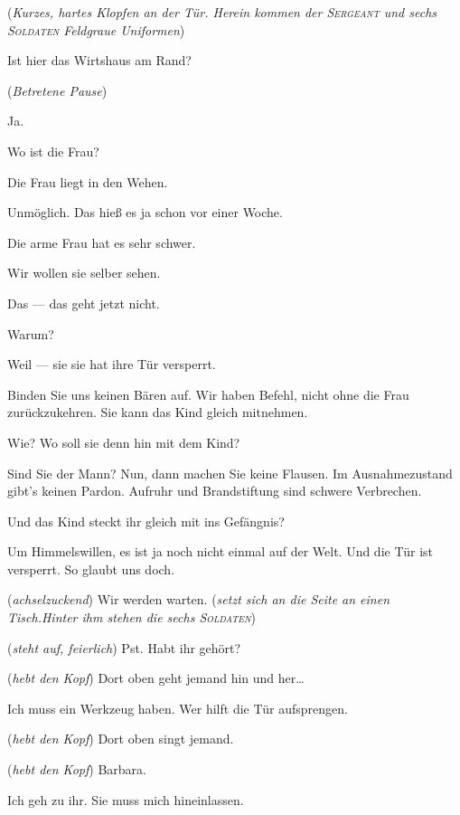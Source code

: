 \documentclass[
	final,
	a4paper,
	ngerman,
	mpinclude = true, %
	twoside = true,
	open = right,
	cleardoublepage = plain,
	DIV = 13,
	BCOR = 1cm,
	titlepage = firstiscover,
	]{scrbook}
\newcommand{\direction}[1]{(\textit{#1})}
\newcommand{\thecharacter}[1]{\textup{\textsc{#1}}\xspace}
\newcommand{\theJosef}{\thecharacter{Josef}}
\newcommand{\theJan}{\thecharacter{Jan}}
\newcommand{\theSergeant}{\thecharacter{Sergeant}}
\newcommand{\theSoldaten}{\thecharacter{Soldaten}}
\newcommand{\character}[1]{\item[#1]}
\newcommand{\Josef}{\character{\theJosef}}
\newcommand{\Jan}{\character{\theJan}}
\newcommand{\Heilsarmeeschwester}{\character{Schwester}}
\newcommand{\Sergeant}{\character{\theSergeant}}
\begin{document}
\begin{play}
\direction{Kurzes, hartes Klopfen an der Tür. Herein kommen der \theSergeant und sechs \theSoldaten Feldgraue Uniformen}

\Sergeant
Ist hier das Wirtshaus am Rand?

\direction{Betretene Pause}

\Heilsarmeeschwester
Ja.

\Sergeant
Wo ist die Frau?

\Heilsarmeeschwester
Die Frau liegt in den Wehen.

\Sergeant
Unmöglich. Das hieß es ja schon vor einer Woche.

\Heilsarmeeschwester
Die arme Frau hat es sehr schwer.

\Sergeant
Wir wollen sie selber sehen.

\Heilsarmeeschwester
Das --- das geht jetzt nicht.

\Sergeant
Warum?

\Heilsarmeeschwester
Weil --- sie sie hat ihre Tür versperrt.

\Sergeant
Binden Sie uns keinen Bären auf. Wir haben Befehl, nicht ohne die Frau zurückzukehren. Sie kann das Kind gleich mitnehmen.

\Josef
Wie? Wo soll sie denn hin mit dem Kind?

\Sergeant
Sind Sie der Mann? Nun, dann machen Sie keine Flausen. Im Ausnahmezustand gibt's keinen Pardon. Aufruhr und Brandstiftung sind schwere Verbrechen.

\Jan
Und das Kind steckt ihr gleich mit ins Gefängnis?

\Heilsarmeeschwester
Um Himmelswillen, es ist ja noch nicht einmal auf der Welt. Und die Tür ist versperrt. So glaubt uns doch.

\Sergeant
\direction{achselzuckend} Wir werden warten. \direction{setzt sich an die Seite an einen Tisch.Hinter ihm stehen die sechs \theSoldaten}

\Jan
\direction{steht auf, feierlich} Pst. Habt ihr gehört?

\Sergeant
\direction{hebt den Kopf} Dort oben geht jemand hin und her\ldots

\Heilsarmeeschwester
Ich muss ein Werkzeug haben. Wer hilft die Tür aufsprengen.

\Sergeant
\direction{hebt den Kopf} Dort oben singt jemand.

\Josef
\direction{hebt den Kopf} Barbara.

\Heilsarmeeschwester
Ich geh zu ihr. Sie muss mich hineinlassen.


\end{play}
\end{document}

